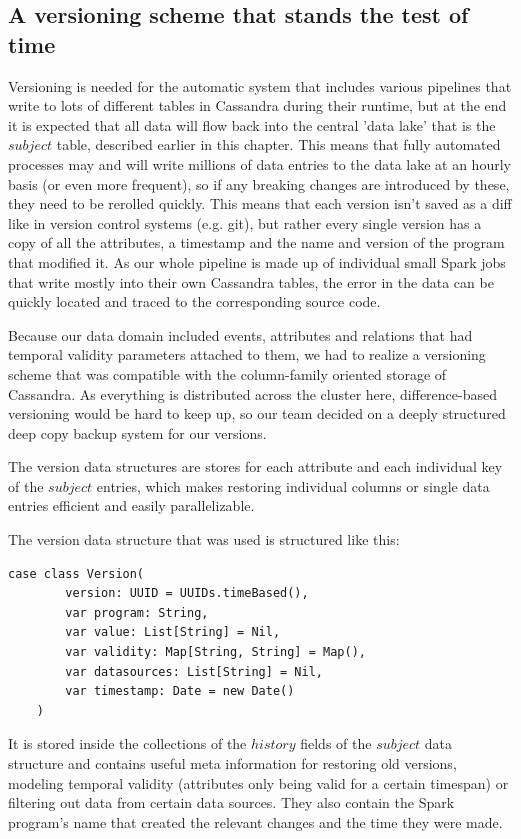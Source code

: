 \documentclass[
        a4paper,     %
        titlepage,   %
        oneside,     %
        parskip      %
]{scrartcl}          %
\begin{document}
    \subsection{A versioning scheme that stands the test of time}
    Versioning is needed for the automatic system that includes various pipelines
    that write to lots of different tables in Cassandra during their runtime,
    but at the end it is expected that all data will flow back into the central
    'data lake' that is the $subject$ table, described earlier in this chapter.
    This means that fully automated processes may and will write millions of
    data entries to the data lake at an hourly basis (or even more frequent),
    so if any breaking changes are introduced by these, they need to be rerolled quickly.
    This means that each version isn't saved as a diff like in version control systems
    (e.g. git), but rather every single version has a copy of all the attributes,
    a timestamp and the name and version of the program that modified it.
    As our whole pipeline is made up of individual small Spark jobs that write
    mostly into their own Cassandra tables, the error in the data can be quickly
    located and traced to the corresponding source code.

    Because our data domain included events, attributes and relations that had
    temporal validity parameters attached to them, we had to realize a versioning
    scheme that was compatible with the column-family oriented storage of Cassandra.
    As everything is distributed across the cluster here, difference-based versioning
    would be hard to keep up, so our team decided on a deeply structured deep copy
    backup system for our versions.

    The version data structures are stores for each attribute and each individual
    key of the $subject$ entries, which makes restoring individual columns or single
    data entries efficient and easily parallelizable.

    The version data structure that was used is structured like this:
    \begin{lstlisting}[style=scalaStyle,caption=Version]
    case class Version(
    	version: UUID = UUIDs.timeBased(),
    	var program: String,
    	var value: List[String] = Nil,
    	var validity: Map[String, String] = Map(),
    	var datasources: List[String] = Nil,
    	var timestamp: Date = new Date()
    )
    \end{lstlisting}

    It is stored inside the collections of the $history$ fields of the $subject$
    data structure and contains useful meta information for restoring old versions,
    modeling temporal validity (attributes only being valid for a certain timespan)
    or filtering out data from certain data sources. They also contain the Spark
    program's name that created the relevant changes and the time they were made.
\end{document}
